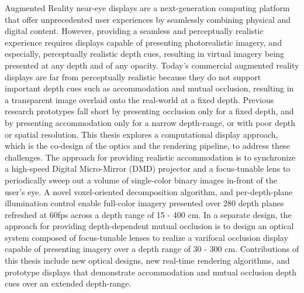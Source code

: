 Augmented Reality near-eye displays are a next-generation computing platform that offer unprecedented user experiences by seamlessly combining physical and digital content. However, providing a seamless and perceptually realistic experience requires displays capable of presenting photorealistic imagery, and especially, perceptually realistic depth cues, resulting in virtual imagery being presented at any depth and of any opacity. Today's commercial augmented reality displays are far from perceptually realistic because they do not support important depth cues such as accommodation and mutual occlusion, resulting in a transparent image overlaid onto the real-world at a fixed depth. Previous research prototypes fall short by presenting occlusion only for a fixed depth, and by presenting accommodation only for a narrow depth-range, or with poor depth or spatial resolution. This thesis explores a computational display approach, which is the co-design of the optics and the rendering pipeline, to address these challenges.  The approach for providing realistic accommodation is to synchronize a high-speed Digital Micro-Mirror (DMD) projector and a focus-tunable lens to periodically sweep out a volume of single-color binary images in-front of the user's eye. A novel voxel-oriented decomposition algorithm, and per-depth-plane illumination control enable full-color imagery presented over 280 depth planes refreshed at 60fps across a depth range of 15 - 400 cm. In a separate design, the approach for providing depth-dependent mutual occlusion is to design an optical system composed of focus-tunable lenses to realize a varifocal occlusion display capable of presenting imagery over a depth range of 30 - 300 cm.  Contributions of this thesis include new optical designs, new real-time rendering algorithms, and prototype displays that demonstrate accommodation and mutual occlusion depth cues over an extended depth-range. 

\clearpage


